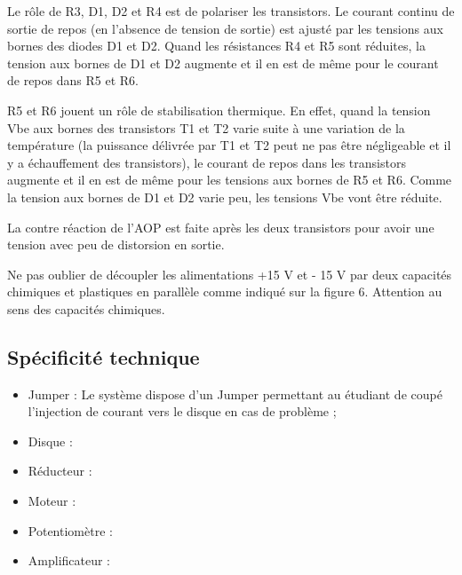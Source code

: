 \noindent
Le rôle de R3, D1, D2 et R4 est de polariser les transistors. Le courant continu de sortie de repos (en l'absence de tension de sortie) est ajusté par les tensions aux bornes des diodes D1 et D2.  Quand les résistances R4 et R5 sont réduites, la tension aux bornes de D1 et D2 augmente et il en est de même pour le courant de repos dans R5 et R6.
\vspace{0.25cm}


\noindent
R5 et R6 jouent un rôle de stabilisation thermique. En effet, quand la tension Vbe aux bornes des transistors T1 et T2 varie suite à une variation de la température (la puissance délivrée par T1 et T2 peut ne pas être négligeable et il y a échauffement des transistors), le courant de repos dans les transistors augmente et il en est de même pour les tensions aux bornes de R5 et R6. Comme la tension aux bornes de D1 et D2 varie peu, les tensions Vbe vont être réduite.
\vspace{0.25cm}


\noindent
La contre réaction de l'AOP est faite après les deux transistors pour avoir une tension avec peu de distorsion en sortie.
\vspace{0.25cm}


\noindent
Ne pas oublier de découpler les alimentations +15 V et - 15 V par deux capacités chimiques et plastiques en parallèle comme indiqué sur la figure 6. Attention au sens des capacités chimiques.

\newpage
\subsection{Spécificité technique}

\begin{itemize}
	\item Jumper : Le système dispose d'un Jumper permettant au étudiant de coupé l'injection de courant vers le disque en cas de problème ;
	\item Disque : 
	\item Réducteur :
	\item Moteur :
	\item Potentiomètre :
	\item Amplificateur :
\end{itemize}

